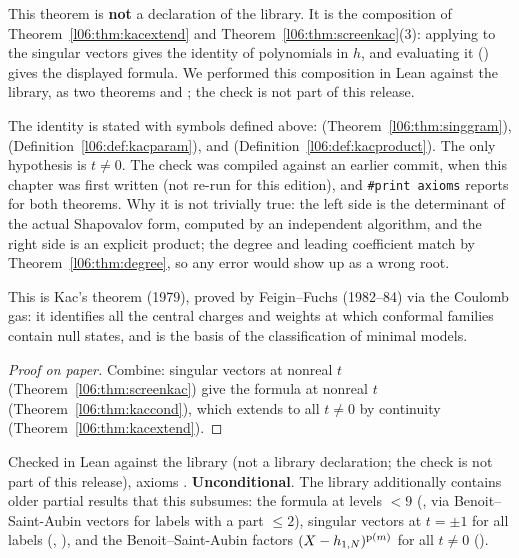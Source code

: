 This theorem is \textbf{not} a declaration of the library. It is the composition of
Theorem~\ref{l06:thm:kacextend} and Theorem~\ref{l06:thm:screenkac}(3): applying
 to the singular vectors  gives the
identity of polynomials in $h$, and evaluating it () gives the displayed formula.
We performed this composition in Lean against the library, as two theorems  and
; the check is not part of this release.

\begin{dictionary}
The identity is stated with symbols defined above:  (Theorem~\ref{l06:thm:singgram}),
 (Definition~\ref{l06:def:kacparam}),  and
 (Definition~\ref{l06:def:kacproduct}). The only hypothesis is $t\ne0$. The
check was compiled against an earlier commit, when this chapter was first written (not re-run for this edition), and \texttt{\#print axioms} reports
\lean{[propext, Classical.}\allowbreak{}\allowbreak\lean{sound]} for both theorems. Why it is not trivially true: the left side
is the determinant of the actual Shapovalov form, computed by an independent algorithm, and the right side
is an explicit product; the degree and leading coefficient match by Theorem~\ref{l06:thm:degree}, so any
error would show up as a wrong root.
\end{dictionary}

\begin{physics}
This is Kac's theorem (1979), proved by Feigin--Fuchs (1982--84) via the Coulomb gas: it identifies all the
central charges and weights at which conformal families contain null states, and is the basis of the
classification of minimal models.
\end{physics}

\begin{proof}[Proof on paper]
Combine: singular vectors at nonreal $t$ (Theorem~\ref{l06:thm:screenkac}) give the formula at nonreal $t$
(Theorem~\ref{l06:thm:kaccond}), which extends to all $t\ne0$ by continuity (Theorem~\ref{l06:thm:kacextend}).
\end{proof}

\begin{status}
Checked in Lean against the library (not a library declaration; the check is not part of this release), axioms
\lean{[propext, Classical.}\allowbreak{}\allowbreak\lean{sound]}. \textbf{Unconditional}. The library additionally contains
older partial results that this subsumes: the formula at levels $<9$ (\allowbreak{}\allowbreak{}\allowbreak{}\allowbreak{},
via Benoit--Saint-Aubin vectors for labels with a part $\le2$), singular vectors at $t = \pm1$ for all
labels (, ), and the Benoit--Saint-Aubin factors
$(X-h_{1,N})^{\mathrm{p}(m)}$ for all $t\ne0$ (\allowbreak{}\allowbreak{}\allowbreak{}).
\end{status}

